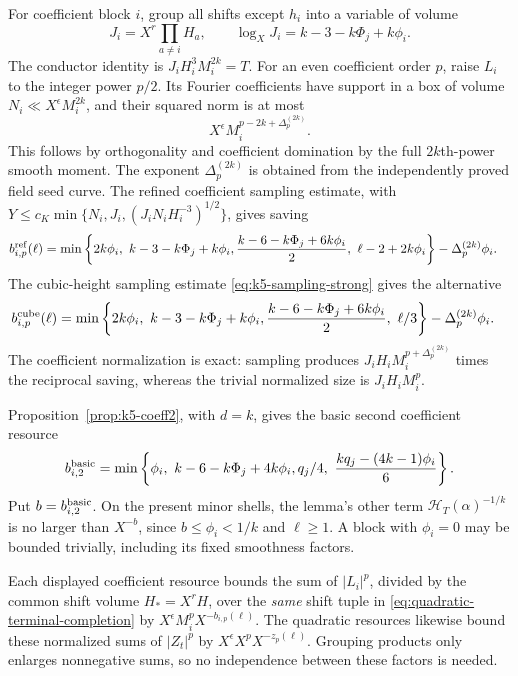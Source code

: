 \documentclass[11pt]{amsart}
\theoremstyle{definition}
\numberwithin{equation}{section}
\begin{document}
For coefficient block $i$, group all shifts except $h_i$ into a variable
of volume
\[
 J_i=X^r\prod_{a\ne i}H_a,
 \qquad \log_X J_i=k-3-k\Phi_j+k\phi_i.
\]
The conductor identity is
$J_iH_i^3M_i^{2k}=T$.
For an even coefficient order $p$, raise $L_i$ to the integer power $p/2$.
Its Fourier coefficients have support in a box of volume
$N_i\ll X^\epsilon M_i^{2k}$, and their squared norm is at most
\[
 X^\epsilon M_i^{p-2k+\Delta_p^{(2k)}}.
\]
This follows by orthogonality and coefficient domination by the full
$2k$th-power smooth moment. The exponent $\Delta_p^{(2k)}$ is obtained
from the independently proved field seed curve. The refined coefficient
sampling estimate, with
$Y\le c_K\min\{N_i,J_i,(J_iN_iH_i^{-3})^{1/2}\}$, gives saving
\begin{align}
 b_{i,p}^{\rm ref}(\ell)
 &=\min\left\{2k\phi_i,\ k-3-k\Phi_j+k\phi_i,
       \frac{k-6-k\Phi_j+6k\phi_i}{2},\ \ell-2+2k\phi_i\right\}
       -\Delta_p^{(2k)}\phi_i.\label{eq:quadratic-terminal-refined}
\end{align}
The cubic-height sampling estimate \eqref{eq:k5-sampling-strong} gives the alternative
\begin{align}
 b_{i,p}^{\rm cube}(\ell)
 &=\min\left\{2k\phi_i,\ k-3-k\Phi_j+k\phi_i,
       \frac{k-6-k\Phi_j+6k\phi_i}{2},\ \ell/3\right\}
       -\Delta_p^{(2k)}\phi_i.\label{eq:quadratic-terminal-cube}
\end{align}
The coefficient normalization is exact: sampling produces
$J_iH_i M_i^{p+\Delta_p^{(2k)}}$ times the reciprocal saving, whereas the
trivial normalized size is $J_iH_iM_i^p$.

Proposition~\ref{prop:k5-coeff2}, with $d=k$, gives the basic second coefficient resource
\begin{equation}\label{eq:quadratic-terminal-basic}
 b_{i,2}^{\rm basic}=
 \min\left\{\phi_i,\ k-6-k\Phi_j+4k\phi_i,
               q_j/4,\ \frac{kq_j-(4k-1)\phi_i}{6}\right\}.
\end{equation}
Put $b=b_{i,2}^{\rm basic}$. On the present minor shells, the lemma's other term
$\mathcal H_T(\alpha)^{-1/k}$ is no larger than $X^{-b}$, since
$b\le\phi_i<1/k$ and $\ell\ge1$.
A block with $\phi_i=0$ may be bounded trivially, including its fixed smoothness factors.

Each displayed coefficient resource bounds the sum of $|L_i|^p$, divided
by the common shift volume $H_*=X^rH$, over the \emph{same} shift tuple in \eqref{eq:quadratic-terminal-completion}
by $X^\epsilon M_i^pX^{-b_{i,p}(\ell)}$.
The quadratic resources likewise bound these normalized sums of $|Z_t|^p$ by
$X^\epsilon X^pX^{-z_p(\ell)}$.
Grouping products only enlarges nonnegative sums, so no independence between
these factors is needed.
\end{document}
